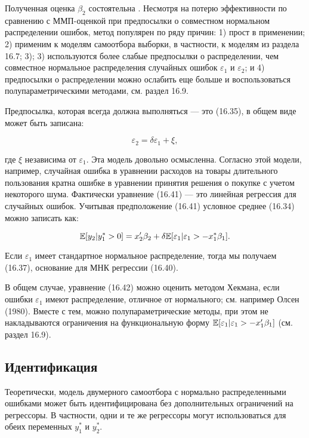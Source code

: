 Полученная оценка $\beta_2$ состоятельна . Несмотря на потерю эффективности по сравнению с ММП-оценкой при предпосылки о совместном нормальном распределении ошибок, метод популярен по ряду причин: 1) прост в применении; 2) применим к моделям самоотбора выборки, в частности, к моделям из раздела 16.7; 3); 3) используются более слабые предпосылки о распределении, чем  совместное нормальное распределения случайных ошибок $\varepsilon_1$ и $\varepsilon_2$; и 4) предпосылки о распределении можно ослабить еще больше и воспользоваться полупараметрическими методами, см. раздел 16.9.

Предпосылка, которая всегда должна выполняться --- это (16.35), в общем виде может быть записана:

\begin{equation}
\varepsilon_2=\delta\varepsilon_1+\xi,
\end{equation}

где $\xi$ независима от $\varepsilon_1$. Эта модель довольно осмысленна. Согласно этой модели, например, случайная ошибка в уравнении расходов на товары длительного пользования кратна ошибке в уравнении принятия решения о покупке с учетом некоторого шума. Фактически уравнение (16.41) --- это линейная регрессия для случайных ошибок.
Учитывая предположение (16.41) условное среднее (16.34) можно записать как:

\begin{equation}
\mathbb{E}[y_2|y_1^{*}>0]=x_2'\beta_2+\delta \mathbb{E}[\varepsilon_1|\varepsilon_1>-x_1^{*}\beta_1].
\end{equation}

Если $\varepsilon_1$ имеет стандартное нормальное распределение, тогда мы получаем (16.37), основание для МНК регрессии (16.40).

В общем случае, уравнение (16.42) можно оценить методом Хекмана, если ошибки $\varepsilon_1$ имеют распределение, отличное от нормального; см. например Олсен (1980). Вместе с тем, можно полупараметрические методы, при этом  не накладываются ограничения на функциональную форму $\mathbb{E}[\varepsilon_1|\varepsilon_1>-x_1'\beta_1]$ (см. раздел 16.9). 

\subsection{Идентификация}

Теоретически, модель двумерного самоотбора с нормально распределенными ошибками может быть идентифицирована без дополнительных ограничений на регрессоры. В частности, одни и те же регрессоры могут использоваться для обеих переменных $y_1^{*}$ и $y_2^{*}$. 

